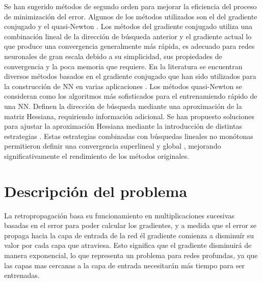 Se han sugerido métodos de segundo orden  para mejorar la eficiencia del proceso de minimización del error. Algunos de los métodos utilizados son el del gradiente conjugado \cite{Fletcher1964, Hestenes1952, Polak1969} y el quasi-Newton \cite{Huang1970, Nocedal2006}. Los métodos del gradiente conjugado utiliza una combinación lineal de la dirección de búsqueda anterior y el gradiente actual lo que produce una convergencia generalmente más rápida, es adecuado para redes neuronales de gran escala debido a su simplicidad, sus propiedades de convergencia y la poca memoria que requiere. En la literatura  se encuentran diversos métodos basados en el gradiente conjugado \cite{Birgin2001, Moller1993} que han sido utilizados para la construcción de NN en varias aplicaciones \cite{Charalambous1992, Peng2007, Sotiropoulos2002}. Los métodos quasi-Newton se consideran como los algoritmos más sofisticados para el entrenamiendo rápido de una NN. Definen la dirección de búsqueda mediante una aproximación de la matriz Hessiana, requiriendo información adicional. Se han propuesto soluciones para ajustar la aproximación Hessiana mediante la introducción de distintas estrategias \cite{Al-Baali1998, Nocedal1993, Oren1972, Oren1974, Yin2007}. Estas estrategias combinadas con búsquedas lineales no monótonas permitieron definir una convergencia superlineal y global \cite{Yin2007}, mejorando significativamente el rendimiento de los métodos originales.

















\section{Descripción del problema}
La retropropagación basa su funcionamiento en multiplicaciones sucesivas basadas en el error para poder calcular los gradientes, y a medida que el error se propaga hacia la capa de entrada de la red él gradiente comienza a disminuír su valor por cada capa que atraviesa. Esto significa que el gradiente disminuirá de manera exponencial, lo que representa un problema para redes profundas, ya que las capas mas cercanas a la capa de entrada necesitarán más tiempo para ser entrenadas.

